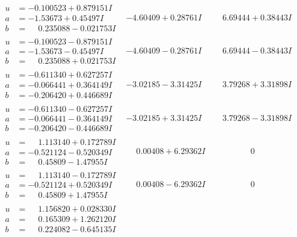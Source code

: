 \documentclass[1p]{elsarticle_modified}
\theoremstyle{definition}
\begin{document}
$$\begin{array}{c|c|c}
\begin{aligned}
u &= -0.100523 + 0.879151 I \\
a &= -1.53673 + 0.45497 I \\
b &= \phantom{-}0.235088 - 0.021753 I\end{aligned}
 & -4.60409 + 0.28761 I & \phantom{-}6.69444 + 0.38443 I \\ \hline\begin{aligned}
u &= -0.100523 - 0.879151 I \\
a &= -1.53673 - 0.45497 I \\
b &= \phantom{-}0.235088 + 0.021753 I\end{aligned}
 & -4.60409 - 0.28761 I & \phantom{-}6.69444 - 0.38443 I \\ \hline\begin{aligned}
u &= -0.611340 + 0.627257 I \\
a &= -0.066441 + 0.364149 I \\
b &= -0.206420 + 0.446689 I\end{aligned}
 & -3.02185 - 3.31425 I & \phantom{-}3.79268 + 3.31898 I \\ \hline\begin{aligned}
u &= -0.611340 - 0.627257 I \\
a &= -0.066441 - 0.364149 I \\
b &= -0.206420 - 0.446689 I\end{aligned}
 & -3.02185 + 3.31425 I & \phantom{-}3.79268 - 3.31898 I \\ \hline\begin{aligned}
u &= \phantom{-}1.113140 + 0.172789 I \\
a &= -0.521124 - 0.520349 I \\
b &= \phantom{-}0.45809 - 1.47955 I\end{aligned}
 & \phantom{-}0.00408 + 6.29362 I & \phantom{-0.000000 } 0 \\ \hline\begin{aligned}
u &= \phantom{-}1.113140 - 0.172789 I \\
a &= -0.521124 + 0.520349 I \\
b &= \phantom{-}0.45809 + 1.47955 I\end{aligned}
 & \phantom{-}0.00408 - 6.29362 I & \phantom{-0.000000 } 0 \\ \hline\begin{aligned}
u &= \phantom{-}1.156820 + 0.028330 I \\
a &= \phantom{-}0.165309 + 1.262120 I \\
b &= \phantom{-}0.224082 - 0.645135 I\end{aligned}

\end{array}$$
\end{document}
